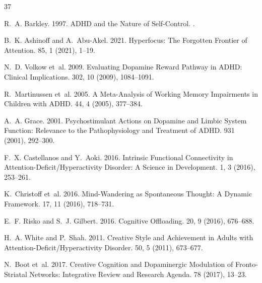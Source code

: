 \documentclass[sigconf,nonacm]{acmart}
\begin{document}
\begin{thebibliography}{37}

R.~A. Barkley. 1997.
\newblock ADHD and the Nature of Self-Control.
.

B.~K. Ashinoff and A.~Abu-Akel. 2021.
\newblock Hyperfocus: The Forgotten Frontier of Attention.
 85, 1 (2021), 1--19.

N.~D. Volkow et~al. 2009.
\newblock Evaluating Dopamine Reward Pathway in ADHD: Clinical Implications.
 302, 10 (2009), 1084--1091.

R.~Martinussen et~al. 2005.
\newblock A Meta-Analysis of Working Memory Impairments in Children with ADHD.
 44, 4 (2005), 377--384.

A.~A. Grace. 2001.
\newblock Psychostimulant Actions on Dopamine and Limbic System Function: Relevance to the Pathophysiology and Treatment of ADHD.
 931 (2001), 292--300.

F.~X. Castellanos and Y.~Aoki. 2016.
\newblock Intrinsic Functional Connectivity in Attention-Deficit/Hyperactivity Disorder: A Science in Development.
 1, 3 (2016), 253--261.

K.~Christoff et~al. 2016.
\newblock Mind-Wandering as Spontaneous Thought: A Dynamic Framework.
 17, 11 (2016), 718--731.

E.~F. Risko and S.~J. Gilbert. 2016.
\newblock Cognitive Offloading.
 20, 9 (2016), 676--688.

H.~A. White and P.~Shah. 2011.
\newblock Creative Style and Achievement in Adults with Attention-Deficit/Hyperactivity Disorder.
 50, 5 (2011), 673--677.

N.~Boot et~al. 2017.
\newblock Creative Cognition and Dopaminergic Modulation of Fronto-Striatal Networks: Integrative Review and Research Agenda.
 78 (2017), 13--23.


\end{thebibliography}
\end{document}
